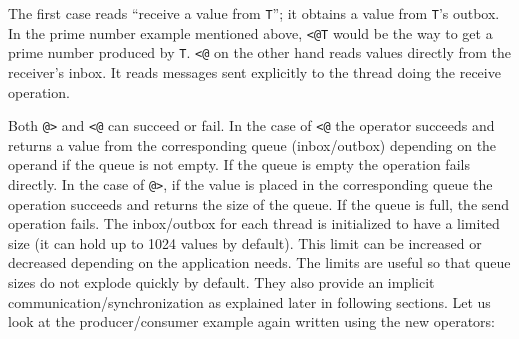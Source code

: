 
\noindent
The first case reads ``receive a value from \texttt{T}''; it obtains a value
from \texttt{T}'s outbox. In the prime number example mentioned
above, \texttt{<@T} would be the way to get a prime number produced by
\texttt{T}. \texttt{{<}@} on the other hand reads values directly from the
receiver's inbox.  It reads messages sent explicitly to the thread doing the
receive operation.

Both \texttt{@>} and \texttt{{<}@} can succeed or fail. In the case of
\texttt{{<}@} the operator succeeds and returns a value from the corresponding
queue (inbox/outbox) depending on the operand if the queue is not empty. If the
queue is empty the operation fails directly. In the case of \texttt{@>}, if the
value is placed in the corresponding queue the operation succeeds and returns
the size of the queue. If the queue is full, the send operation fails. The
inbox/outbox for each thread is initialized to have a limited size (it can hold
up to 1024 values by default). This limit can be increased or decreased
depending on the application needs. The limits are useful so that queue sizes do
not explode quickly by default. They also provide an implicit
communication/synchronization as explained later in following sections.  Let us
look at the producer/consumer example again written using the new operators:


